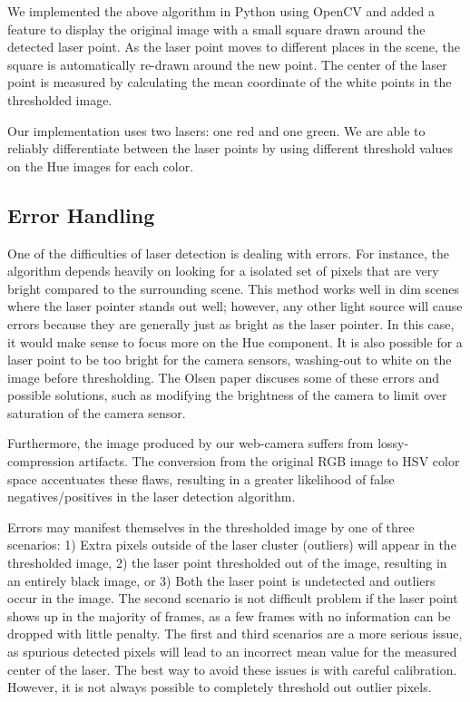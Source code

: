 \documentclass[10pt,twocolumn,letterpaper]{article}
\begin{document}
We implemented the above algorithm in Python using OpenCV and added a feature to display the original image with a small square drawn around the detected laser point.  As the laser point moves to different places in the scene, the square is automatically re-drawn around the new point.  The center of the laser point is measured by calculating the mean coordinate of the white points in the thresholded image.

Our implementation uses two lasers: one red and one green.  We are able to reliably differentiate between the laser points by using different threshold values on the Hue images for each color.

\subsection{Error Handling}

One of the difficulties of laser detection is dealing with errors. For instance, the algorithm depends heavily on looking for a isolated set of pixels that are very bright compared to the surrounding scene. This method works well in dim scenes where the laser pointer stands out well; however, any other light source will cause errors because they are generally just as bright as the laser pointer. In this case, it would make sense to focus more on the Hue component. It is also possible for a laser point to be too bright for the camera sensors, washing-out to white on the image before thresholding. The Olsen paper \cite{olsen01laser} discuses some of these errors and possible solutions, such as modifying the brightness of the camera to limit over saturation of the camera sensor.

Furthermore, the image produced by our web-camera suffers from lossy-compression artifacts.  The conversion from the original RGB image to HSV color space accentuates these flaws, resulting in a greater likelihood of false negatives/positives in the laser detection algorithm.

Errors may manifest themselves in the thresholded image by one of three scenarios: 1) Extra pixels outside of the laser cluster (outliers) will appear in the thresholded image, 2) the laser point thresholded out of the image, resulting in an entirely black image, or 3) Both the laser point is undetected and outliers occur in the image.  The second scenario is not difficult problem if the laser point shows up in the majority of frames, as a few frames with no information can be dropped with little penalty.  The first and third scenarios are a more serious issue, as spurious detected pixels will lead to an incorrect mean value for the measured center of the laser.  The best way to avoid these issues is with careful calibration.  However, it is not always possible to completely threshold out outlier pixels.
\end{document}
